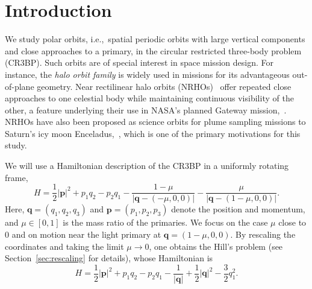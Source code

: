 \documentclass[pdflatex,sn-mathphys-ay]{sn-jnl}%
\theoremstyle{thmstyleone}%
\theoremstyle{thmstyletwo}%
\theoremstyle{thmstylethree}%
\begin{document}



\maketitle

\tableofcontents

\newpage
\section{Introduction}
We study polar orbits, i.e.,~spatial periodic orbits with large vertical components and close approaches to a primary, in the circular restricted three-body problem (CR3BP). Such orbits are of special interest in space mission design. For instance, the \emph{halo orbit family} is widely used in missions for its advantageous out-of-plane geometry. Near rectilinear halo orbits (NRHOs)~\cite{howell_breakwell_almost_rectilinear_halo_1984} offer repeated close approaches to one celestial body while maintaining continuous visibility of the other, a feature underlying their use in NASA's planned Gateway mission,~\cite{fuller_gateway_2022}. NRHOs have also been proposed as science orbits for plume sampling missions to Saturn's icy moon Enceladus,~\cite{russell_lara_enceladus_2009,mackenzie_orbilander_2021}, which is one of the primary motivations for this study.

We will use a Hamiltonian description of the CR3BP in a uniformly rotating frame,
\[
H =\frac{1}{2}|\mathbf{p}|^2 +p_1q_2-p_2q_1 -\frac{1-\mu}{|\mathbf{q}-(-\mu,0,0)|}
-\frac{\mu}{|\mathbf{q}-(1-\mu,0,0)|}.
\]
Here, $\mathbf{q}=(q_1, q_2, q_3)$ and $\mathbf{p}=(p_1, p_2, p_3)$ denote the position and momentum, and $\mu\in [0,1]$ is the mass ratio of the primaries. We focus on the case $\mu$ close to $0$ and on motion near the light primary at $\mathbf{q}=(1 - \mu, 0, 0)$. By rescaling the coordinates and taking the limit $\mu\to 0$, one obtains the Hill's problem (see Section~\ref{sec:rescaling} for details), whose Hamiltonian is 
\[
H =\frac{1}{2}|\mathbf{p}|^2 +p_1q_2-p_2q_1 -\frac{1}{|\mathbf{q}|} +\frac{1}{2} |\mathbf{q}|^2
-\frac{3}{2}q_1^2 .
\]
\end{document}
